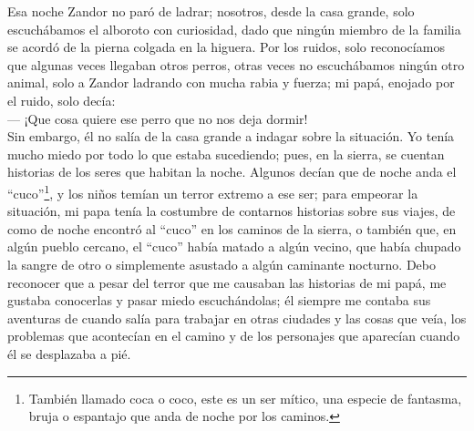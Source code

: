 Esa noche Zandor no paró de ladrar; nosotros, desde la casa grande, solo escuchábamos el alboroto con curiosidad, dado que ningún miembro de la familia se acordó de la pierna colgada en la higuera. 
Por los ruidos, solo reconocíamos que algunas veces llegaban otros perros, otras veces no escuchábamos ningún otro animal, solo a Zandor ladrando con mucha rabia y fuerza; mi papá, enojado por el ruido, solo decía:\\\indent
--- ¡Que cosa quiere ese perro que no nos deja dormir!\\\indent
Sin embargo, él no salía de la casa grande a indagar sobre la situación. 
Yo tenía mucho miedo por todo lo que estaba sucediendo; pues, en la sierra, se cuentan historias de los seres que habitan la noche.
Algunos decían que de noche anda el ``cuco''\footnote{También llamado coca o coco, este es un ser mítico, una especie de fantasma, bruja o espantajo que anda de noche por los caminos.}, y los niños temían un terror extremo a ese ser; para empeorar la situación, mi papa tenía la costumbre de contarnos historias sobre sus viajes, de como de noche encontró al ``cuco'' en los caminos de la sierra, o también que, en algún pueblo cercano, el ``cuco'' había matado a algún vecino, que había chupado la sangre de otro o simplemente asustado a algún caminante nocturno. Debo reconocer que a pesar del terror que me causaban las historias de mi papá, me gustaba conocerlas y pasar miedo escuchándolas; él siempre me contaba sus aventuras de cuando salía para trabajar en otras ciudades y las cosas que veía, los problemas que acontecían en el camino y de los personajes que aparecían cuando él se desplazaba a pié.

